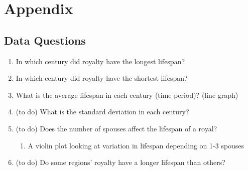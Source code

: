 \documentclass{article}
\begin{document}
\printbibliography

\section{Appendix}
\subsection{Data Questions}

\begin{enumerate}
    \item In which century did royalty have the longest lifespan? 
    \item In which century did royalty have the shortest lifespan? 
    \item What is the average lifespan in each century (time period)? (line graph) 
    \item (to do) What is the standard deviation  in each century? 
    \item (to do) Does the number of spouses affect the lifespan of a royal? 
    \begin{enumerate}
        \item A violin plot looking at variation in lifespan depending on 1-3 spouses
    \end{enumerate}
    \item (to do) Do some regions’ royalty have a longer lifespan than others? 
\end{enumerate}
\end{document}
